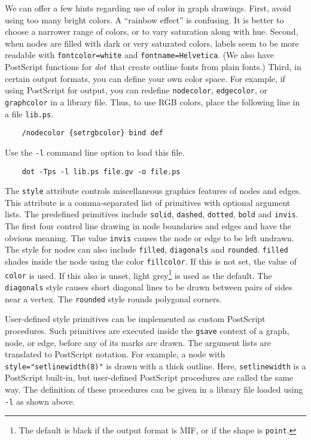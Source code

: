 \documentclass[11pt]{article}
\def\dot{{\it dot}}
\begin{document}
We can offer a few hints regarding use of color in graph drawings.
First, avoid using too many bright colors.
A ``rainbow effect'' is confusing.
It is better to choose a narrower range of colors, or
to vary saturation along with hue.
Second, when nodes are filled with dark or very saturated
colors, labels seem to be more readable with \verb"fontcolor=white"
and \verb"fontname=Helvetica".  (We also have PostScript functions
for \dot\ that create outline fonts from plain fonts.)
Third, in certain output formats, you can define your own color space.
For example, if using PostScript for output, you can redefine
\verb"nodecolor", \verb"edgecolor", or \verb"graphcolor"
in a library file.  Thus, to use RGB colors, place
the following line in a file \verb"lib.ps".
\begin{verbatim}
    /nodecolor {setrgbcolor} bind def
\end{verbatim}
Use the \verb"-l" command line option to load this file.
\begin{verbatim}
    dot -Tps -l lib.ps file.gv -o file.ps
\end{verbatim}

The {\tt style} attribute controls miscellaneous graphics features of 
nodes and edges.
This attribute is a comma-separated list of primitives with 
optional argument lists.
The predefined primitives include \verb"solid", \verb"dashed", \verb"dotted",
\verb"bold" and \verb"invis".
The first four control line drawing in node boundaries and edges and
have the obvious meaning. The value {\tt invis} causes the node or edge
to be left undrawn.
The style for nodes can also include \verb"filled", 
\verb"diagonals" and \verb"rounded".
\verb"filled" shades inside the node
using the color {\tt fillcolor}. If this is not set, the value of
{\tt color} is used. If this also is unset,
light grey\footnote{The default is black if the output format is MIF,
or if the shape is {\tt point}.} is used as the default.
The \verb"diagonals" style causes short diagonal lines to be drawn
between pairs of sides near a vertex. The \verb"rounded" style rounds 
polygonal corners.

User-defined style primitives can be implemented as custom
PostScript procedures.  Such primitives are executed inside the
\verb"gsave" context of a graph, node, or edge, before any of its
marks are drawn.  The argument lists are translated to PostScript notation.
For example, a node with \verb'style="setlinewidth(8)"'  is drawn with a
thick outline.  Here, \verb"setlinewidth" is a PostScript built-in, but
user-defined PostScript procedures are called the same way.  The
definition of these procedures can be given in a library file loaded
using \verb"-l" as shown above.
\end{document}
